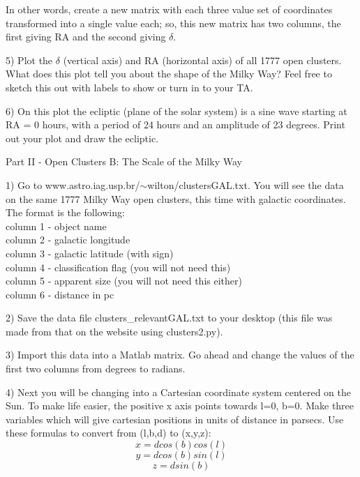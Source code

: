 \documentclass[11pt]{article}
\begin{document}
In other words, create a new matrix with each three value set of coordinates transformed into a single value each; so, this new matrix has two columns, the first giving RA and the second giving $\delta$.

5) Plot the $\delta$ (vertical axis) and RA (horizontal axis) of all 1777
open clusters.  What does this plot tell you about the shape of the
Milky Way?  Feel free to sketch this out with labels to show or turn in to your TA.  

6) On this plot the ecliptic (plane of the solar system) is a sine
wave starting at RA = 0 hours, with a period of 24 hours and an
amplitude of 23 degrees.  Print out your plot and draw the ecliptic.  

Part II - Open Clusters B: The Scale of the Milky Way

1) Go to www.astro.iag.usp.br/$\sim$wilton/clustersGAL.txt.  You will see the data
on the same 1777 Milky Way open clusters, this time with galactic coordinates.  The format is the following:\\
column 1 - object name\\
column 2 - galactic longitude\\
column 3 - galactic latitude (with sign)\\
column 4 - classification flag (you will not need this)\\
column 5 - apparent size (you will not need this either)\\
column 6 - distance in pc

2) Save the data file clusters\_relevantGAL.txt to your desktop (this file was made from that on the website using clusters2.py).

3) Import this data into a Matlab matrix.  Go ahead and change the values of the first two columns from degrees to radians.

4) Next you will be changing into a Cartesian coordinate system
centered on the Sun.  To make life easier, the positive x axis points
towards l=0, b=0. Make three variables which will give cartesian positions in units of distance in parsecs.  Use these formulas to convert from (l,b,d) to (x,y,z):
\begin{equation}
x = d cos(b)cos(l)
\end{equation}
\begin{equation}
y = d cos(b)sin(l)
\end{equation}
\begin{equation}
z = d sin(b)
\end{equation}
\end{document}
